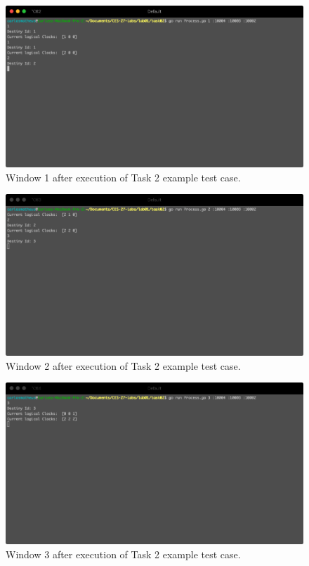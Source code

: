 \documentclass[a4paper, 11pt]{article}
\begin{document}


\begin{figure}[h]
  \begin{center}
  \includegraphics[width=4.5in]{./imgs/task2_example_window1.png}
  \caption{Window 1 after execution of Task 2 example test case.}
  \label{img_task2_example_window1}
  \end{center}
\end{figure}

\begin{figure}[h]
  \begin{center}
  \includegraphics[width=4.5in]{./imgs/task2_example_window2.png}
  \caption{Window 2 after execution of Task 2 example test case.}
  \label{img_task2_example_window2}
  \end{center}
\end{figure}

\begin{figure}[h]
  \begin{center}
  \includegraphics[width=4.5in]{./imgs/task2_example_window3.png}
  \caption{Window 3 after execution of Task 2 example test case.}
  \label{img_task2_example_window3}
  \end{center}
\end{figure}
\end{document}

